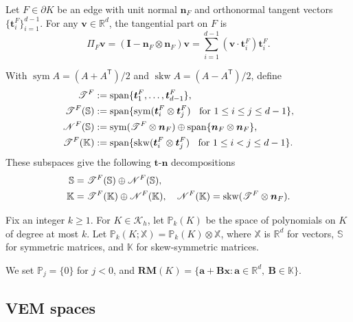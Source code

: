 \documentclass[review,hidelinks,onefignum,onetabnum]{siamart251216}
\newcommand{\sym}{\operatorname{sym}}
\newcommand{\skw}{\operatorname{skw}}
\begin{document}
Let $F \in \partial K$ be an edge with unit normal $\boldsymbol{n}_F$ and orthonormal tangent vectors $\{\boldsymbol{t}_i^{F}\}_{i=1}^{d-1}$. For any $\boldsymbol{v}\in\mathbb{R}^d$, the tangential part on $F$ is
$$
\Pi_F \boldsymbol{v}=(\boldsymbol{I}-\boldsymbol{n}_F\otimes\boldsymbol{n}_F)\boldsymbol{v}
=\sum_{i=1}^{d-1}(\boldsymbol{v}\cdot\boldsymbol{t}_i^{F})\boldsymbol{t}_i^{F}.
$$

With $\sym A=(A+A^{\mathsf T})/2$ and $\skw A=(A-A^{\mathsf T})/2$, define
\begin{align*}
\mathscr T^F&:=\textrm{span}\{\boldsymbol{t}_1^F, \ldots, \boldsymbol{t}_{d-1}^F\}, \\
\mathscr T^F(\mathbb S)&:=\textrm{span}\{{\rm sym}(\boldsymbol{t}_i^F\otimes \boldsymbol{t}_j^F) \;\;\textrm{ for } 1\leq i\leq j\leq d-1\}, \\
\mathscr N^F(\mathbb S) &:= \sym(\mathscr T^F\otimes\boldsymbol{n}_F)\oplus {\rm span}\{\boldsymbol{n}_F\otimes\boldsymbol{n}_F\},\\
\mathscr T^F(\mathbb K)&:=\textrm{span}\{{\rm skw}(\boldsymbol{t}_i^F\otimes \boldsymbol{t}_j^F) \;\;\textrm{ for } 1\leq i< j\leq d-1\}.
\end{align*}
These subspaces give the following $\boldsymbol{t}$-$\boldsymbol{n}$ decompositions
\begin{align}\label{eq:decS}
\mathbb S&= \mathscr T^F(\mathbb S)\oplus \mathscr N^F(\mathbb S), \quad
\\
\mathbb K&= \mathscr T^F(\mathbb K)\oplus \mathscr N^F(\mathbb K), \quad \mathscr N^F(\mathbb K)={\rm skw}(\mathscr T^F\otimes\boldsymbol{n}_F).
\end{align}


Fix an integer $k\geq1$. For \(K \in \mathcal{K}_h\), let \(\mathbb{P}_k(K)\) be the space of polynomials on \(K\) of degree at most \(k\). Let \(\mathbb{P}_k(K; \mathbb{X}) = \mathbb{P}_k(K) \otimes \mathbb{X}\), where \(\mathbb{X}\) is \(\mathbb{R}^d\) for vectors, \(\mathbb{S}\) for symmetric matrices, and \(\mathbb{K}\) for skew-symmetric matrices.

We set $\mathbb P_j=\{0\}$ for $j<0$, and
$\mathbf{RM}(K)=\{\boldsymbol a+\boldsymbol B\boldsymbol x:
\boldsymbol a\in\mathbb R^d,\ \boldsymbol B\in\mathbb K\}$.

\subsection{VEM spaces}
\end{document}
